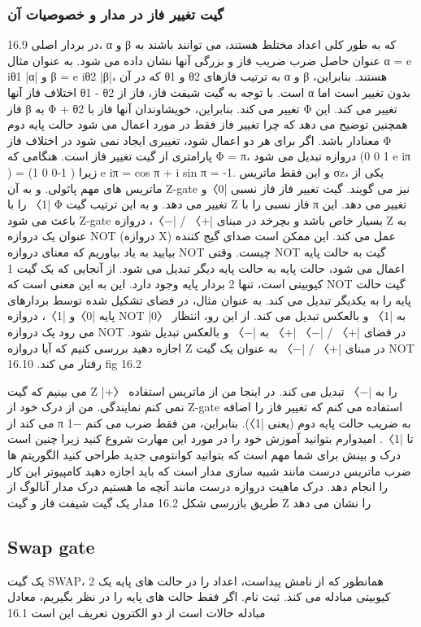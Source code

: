 \documentclass{book}
\begin{document}
\subsubsection{گیت تغییر فاز در مدار و خصوصیات آن}
16.9
در بردار اصلی، α و β که به طور کلی اعداد مختلط هستند، می توانند باشند
به عنوان حاصل ضرب ضریب فاز و بزرگی آنها نشان داده می شود. به عنوان مثال α =
e iθ1 |α| و β = e iθ2 |β|، که در آن θ1 و θ2 به ترتیب فازهای α و β هستند.
بنابراین، اختلاف فاز آنها θ1 - θ2 است. با توجه به گیت شیفت فاز، فاز
از α بدون تغییر است اما فاز β به Φ + θ2 تغییر می کند. بنابراین، خویشاوندان آنها
فاز با Φ تغییر می کند. این همچنین توضیح می دهد که چرا تغییر فاز فقط در مورد اعمال می شود
حالت پایه دوم معنادار باشد. اگر برای هر دو اعمال شود، تغییری ایجاد نمی شود
در اختلاف فاز
Φ پارامتری از گیت تغییر فاز است. هنگامی که Φ = π، دروازه تبدیل می شود (1 0
0 e iπ
)
=
(1 0
0-1
)
زیرا e iπ = cos π + i sin π = -1. و این فقط
ماتریس σz، یکی از ماتریس های مهم پائولی. و به آن Z-gate نیز می گویند.
گیت تغییر فاز فاز نسبی |0〉و |1〉 را با Φ تغییر می دهد. و به این ترتیب
گیت Z فاز نسبی را با π تغییر می دهد. این باعث می شود Z-gate بسیار خاص باشد و بچرخد
در مبنای |+〉 / |−〉، دروازه Z به عنوان یک دروازه NOT (دروازه X) عمل می کند. این ممکن است
صدای گیج کننده بیایید به یاد بیاوریم که معنای دروازه NOT چیست. وقتی NOT
گیت به حالت پایه اعمال می شود، حالت پایه به حالت پایه دیگر تبدیل می شود.
از آنجایی که یک گیت 1 کیوبیتی است، تنها 2 بردار پایه وجود دارد. این به این معنی است که NOT
گیت حالت پایه را به یکدیگر تبدیل می کند. به عنوان مثال، در فضای تشکیل شده توسط
بردارهای پایه |0〉و |1〉، دروازه NOT |0〉 به |1〉 و بالعکس تبدیل می کند. از این رو،
انتظار می رود یک دروازه NOT در فضای |+〉 / |−〉 |+〉 ​​به |−〉 و بالعکس تبدیل شود.
اجازه دهید بررسی کنیم که آیا دروازه Z در مبنای |+〉 / |−〉 به عنوان یک گیت NOT رفتار می کند.
16.10
fig 16.2


می بینیم که گیت Z |+〉 را به |−〉 تبدیل می کند. در اینجا من از ماتریس استفاده نمی کنم
نمایندگی. من از درک خود از Z-gate استفاده می کنم که تغییر فاز را اضافه می کند
از π به ضریب حالت پایه دوم (یعنی |1〉). بنابراین، من فقط ضرب می کنم
−1 تا |1〉. امیدوارم بتوانید آموزش خود را در مورد این مهارت شروع کنید زیرا چنین است
درک و بینش برای شما مهم است که بتوانید کوانتومی جدید طراحی کنید
الگوریتم ها ضرب ماتریس درست مانند شبیه سازی مدار است که باید
اجازه دهید کامپیوتر این کار را انجام دهد. درک ماهیت دروازه درست مانند آنچه ما هستیم
درک مدار آنالوگ از طریق بازرسی
شکل 16.2 مدار یک گیت شیفت فاز و گیت Z را نشان می دهد
\subsection{Swap gate}
یک گیت SWAP، همانطور که از نامش پیداست، اعداد را در حالت های پایه یک 2 کیوبیتی مبادله می کند.
ثبت نام. اگر فقط حالت های پایه را در نظر بگیریم، معادل مبادله حالات است
از دو الکترون تعریف این است
16.1
\end{document}

